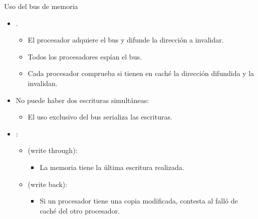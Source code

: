\begin{frame}[t]{Uso del bus de memoria}
\begin{itemize}
  \item {}.
    \begin{itemize}
      \item El procesador adquiere el bus y difunde la dirección a invalidar.
      \item Todos los procesadores espían el bus.
      \item Cada procesador comprueba si tienen en caché la dirección difundida y la invalidan.
    \end{itemize}

  \item No puede haber dos escrituras simultáneas:
    \begin{itemize}
      \item El uso exclusivo del bus serializa las escrituras.
    \end{itemize}

  \item {}:
    \begin{itemize}
      \item {} (write through):
        \begin{itemize}
          \item La memoria tiene la última escritura realizada.
        \end{itemize}
      \item {} (write back):
        \begin{itemize}
          \item Si un procesador tiene una copia modificada, contesta al falló de caché del otro procesador.
        \end{itemize}
    \end{itemize}
\end{itemize}
\end{frame}

